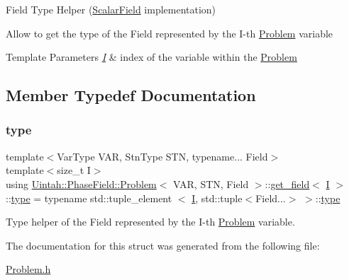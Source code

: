 Field Type Helper (\hyperlink{structUintah_1_1PhaseField_1_1ScalarField}{Scalar\+Field} implementation) 

Allow to get the type of the Field represented by the I-\/th \hyperlink{classUintah_1_1PhaseField_1_1Problem}{Problem} variable


\begin{DoxyTemplParams}{Template Parameters}
{\em \hyperlink{structUintah_1_1PhaseField_1_1I}{I}} & index of the variable within the \hyperlink{classUintah_1_1PhaseField_1_1Problem}{Problem} \\
\hline
\end{DoxyTemplParams}


\subsection{Member Typedef Documentation}
\mbox{\label{structUintah_1_1PhaseField_1_1Problem_1_1get__field_3_01I_01_4_a362caedbe580a034ff198b7369f2fc82}} 
\subsubsection{\texorpdfstring{type}{type}}
{\footnotesize\ttfamily template$<$Var\+Type V\+AR, Stn\+Type S\+TN, typename... Field$>$ \\
template$<$size\+\_\+t I$>$ \\
using \hyperlink{classUintah_1_1PhaseField_1_1Problem}{Uintah\+::\+Phase\+Field\+::\+Problem}$<$ V\+AR, S\+TN, Field $>$\+::\hyperlink{structUintah_1_1PhaseField_1_1Problem_1_1get__field}{get\+\_\+field}$<$ \hyperlink{structUintah_1_1PhaseField_1_1I}{I} $>$\+::\hyperlink{structUintah_1_1PhaseField_1_1Problem_1_1get__field_3_01I_01_4_a362caedbe580a034ff198b7369f2fc82}{type} =  typename std\+::tuple\+\_\+element $<$ \hyperlink{structUintah_1_1PhaseField_1_1I}{I}, std\+::tuple$<$Field...$>$ $>$\+::\hyperlink{structUintah_1_1PhaseField_1_1Problem_1_1get__field_3_01I_01_4_a362caedbe580a034ff198b7369f2fc82}{type}}



Type helper of the Field represented by the I-\/th \hyperlink{classUintah_1_1PhaseField_1_1Problem}{Problem} variable. 



The documentation for this struct was generated from the following file\+:\begin{DoxyCompactItemize}
\item 
\hyperlink{Problem_8h}{Problem.\+h}\end{DoxyCompactItemize}
